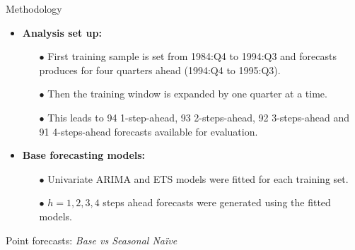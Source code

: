 \documentclass[11pt,xcolor=dvipsnames,table]{beamer} %
\def\Naive{Na\"{i}ve\ }
\begin{document}
\begin{frame}{Methodology}
\begin{itemize}[<+-| alert@+>]
	\item \textbf{Analysis set up:}
	\begin{itemize}[<+-| alert@+>]
		\item[$\bullet$] First training sample is set from 1984:Q4 to 1994:Q3 and forecasts produces for four quarters ahead (1994:Q4 to 1995:Q3).
		\item[$\bullet$] Then the training window is expanded by one quarter at a time.
		\item[$\bullet$] This leads to 94 1-step-ahead, 93 2-steps-ahead, 92 3-steps-ahead and 91 4-steps-ahead forecasts available for evaluation. 
	\end{itemize}
	\item[]
	\item \textbf{Base forecasting models:}
	\begin{itemize}[<+-| alert@+>]
		\item[$\bullet$] Univariate ARIMA and ETS models were fitted for each training set. \item[$\bullet$] $h=1,2,3,4$ steps ahead forecasts were generated using the fitted models.
	\end{itemize}
	
\end{itemize}
\end{frame}


\begin{frame}{Point forecasts: \textit{Base vs Seasonal \Naive}}
\begin{itemize}[<+-| alert@+>]
	\item[] 
	
	
\end{itemize}
\end{frame}
\end{document}
